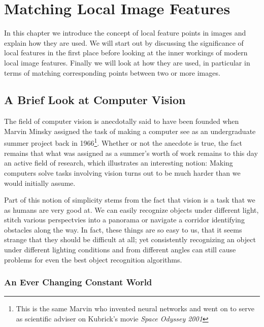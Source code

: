 \chapter{Matching Local Image Features}
\label{C:Background}

In this chapter we introduce the concept of local feature points in 
images and explain how they are used. We will start out by discussing 
the significance of local features in the first place before looking at 
the inner workings of modern local image features. Finally we will look 
at how they are used, in particular in terms of matching corresponding 
points between two or more images.

\section{A Brief Look at Computer Vision}

The field of computer vision is anecdotally said to have been founded 
when Marvin Minsky assigned the task of making a computer see as an 
undergraduate summer project back in 1966\footnote{This is the same 
Marvin who invented neural networks and went on to serve as scientific 
adviser on Kubrick's movie \emph{Space Odyssey 2001}}.  Whether or not 
the anecdote is true, the fact remains that what was assigned as a 
summer's worth of work remains to this day an active field of research, 
which illustrates an interesting notion: Making computers solve tasks 
involving vision turns out to be much harder than we would initially 
assume.

Part of this notion of simplicity stems from the fact that vision is a 
task that we as humans are very good at. We can easily recognize objects 
under different light, stitch various perspectvies into a panorama or 
navigate a corridor identifying obstacles along the way.  In fact, these 
things are so easy to us, that it seems strange that they should be 
difficult at all; yet consistently recognizing an object under different 
lighting conditions and from different angles can still cause problems 
for even the best object recognition algorithms.

\subsection{An Ever Changing Constant World}

